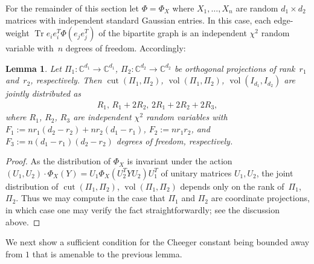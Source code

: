 \documentclass[aos]{imsart}
\newtheorem{lemma}[theorem]{Lemma}
\theoremstyle{definition}
\numberwithin{equation}{section}
\DeclareMathOperator{\vol}{vol}
\DeclareMathOperator{\cut}{cut}
\DeclareMathOperator{\tr}{Tr}
\newcommand{\C}{{\mathbb{C}}}
\begin{document}
\begin{appendix}
For the remainder of this section let $\Phi = \Phi_X$ where $X_1, \dots, X_n$ are random $d_1 \times d_2$ matrices with independent standard Gaussian entries.
In this case, each edge-weight $\tr e_i e_i^T \Phi(e_j e_j^T)$ of the bipartite graph is an independent $\chi^2$ random variable with~$n$ degrees of freedom.
Accordingly:

\begin{lemma}\label{fact:chi}
Let $\Pi_1\colon\C^{d_1} \to \C^{d_1}$, $\Pi_2\colon \C^{d_2} \to \C^{d_2}$ be orthogonal projections of rank~$r_1$ and~$r_2$, respectively.
Then $\cut(\Pi_1, \Pi_2)$, $\vol(\Pi_1, \Pi_2)$, $\vol(I_{d_1}, I_{d_2})$ are jointly distributed as
\begin{align*}
  R_1, \, R_1 + 2R_2, \, 2R_1 + 2 R_2 + 2R_3,
\end{align*}
where $R_1$, $R_2$, $R_3$ are independent $\chi^2$ random variables with $F_1:=n r_1(d_2 - r_2) + n r_2(d_1-r_1)$, $F_2:= n r_1r_2$, and $F_3:= n(d_1 - r_1)(d_2 - r_2)$ degrees of freedom, respectively.
\end{lemma}
\begin{proof} As the distribution of $\Phi_X$ is invariant under the action $(U_1, U_2) \cdot \Phi_X(Y) =  U_1\Phi_X( U_2^T Y U_2) U_1^T$ of unitary matrices $U_1, U_2$, the joint distribution of $\cut(\Pi_1, \Pi_2)$, $\vol(\Pi_1, \Pi_2)$ depends only on the rank of~$\Pi_1$, $\Pi_2$. Thus we may compute in the case that $\Pi_1$ and $\Pi_2$ are coordinate projections, in which case one may verify the fact straightforwardly; see the discussion above.
\end{proof}

We next show a sufficient condition for the Cheeger constant being bounded away from $1$ that is amenable to the previous lemma.


\end{appendix}
\end{document}
